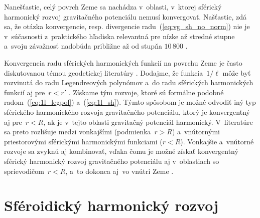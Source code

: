 \documentclass[a4paper, 12pt]{book}
\begin{document}
Nanešťastie, celý povrch Zeme sa nachádza v~oblasti, v~ktorej sférický 
harmonický rozvoj gravitačného potenciálu nemusí konvergovať.  Našťastie, zdá 
sa, že otázka konvergencie, resp. divergencie radu~(\ref{eq:vg_sh_no_norm}) nie 
je v~súčasnosti z~praktického hľadiska relevantná pre nízke až stredné stupne 
a~svoju závažnosť nadobúda približne až od stupňa $10\, 800$ 
\parencite{Hirt2016,Rexer2017}.

Konvergencia radu sférických harmonických funkcií na povrchu Zeme je často 
diskutovanou témou geodetickej literatúry 
\parencite{Hotine,Borre_chapter4,MoritzAdvancedGeodesy,Sjoberg1980,Jekeli1983,SansoGeoidDetermination}.  
Dodajme, že funkcia~$1 \slash \ell$ môže byť rozvinutá do radu Legendreových 
polynómov a~do radu sférických harmonických funkcií aj pre~$r < r'$ 
\parencite[napríklad][]{Martinec1998,MoritzPhysicalGeodesy}.  Získame tým 
rozvoje, ktoré sú formálne podobné radom~(\ref{eq:1l_legpol}) 
a~(\ref{eq:1l_sh}).  Týmto spôsobom je možné odvodiť iný typ sférického 
harmonického rozvoja gravitačného potenciálu, ktorý je konvergentný aj pre~$r 
< R$, ak je v~tejto oblasti gravitačný potenciál harmonický.  V~literatúre sa 
preto rozlišuje medzi vonkajšími (podmienka~$r > R$) a~vnútornými priestorovými 
sférickými harmonickými funkciami ($r < R$).  Vonkajšie a~vnútorné rozvoje sa 
zvyknú aj kombinovať, vďaka čomu je možné získať konvergentný sférický 
harmonický rozvoj gravitačného potenciálu aj v~oblastiach so sprievodičom~$r 
< R$, a~to dokonca aj~vo vnútri Zeme 
\parencite[napríklad][]{Sjoberg1977,Jekeli1983,Grafarend1993,Wang1997,Martinec1998,Wang2013}.






\chapter{Sféroidický harmonický rozvoj}
\label{sec:spheroidal_harmonics_chapter}
\end{document}
